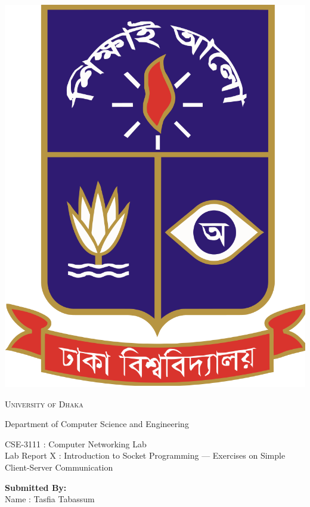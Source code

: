 \documentclass[11pt]{article}
\begin{document}
\begin{titlepage}
	\begin{center}
    	\includegraphics[scale=0.10]{du.png}\par
		\begin{Huge}
			\textsc{University of Dhaka}\par
		\end{Huge}
		\begin{Large}
			Department of Computer Science and Engineering\par \vspace{1cm}
			CSE-3111 : Computer Networking Lab \\[12pt]	
			Lab Report X : Introduction to Socket Programming — Exercises on Simple Client-Server Communication
		\end{Large}
	\end{center}  	
	\begin{large}
		\textbf{Submitted By:\\[12pt]}
			Name : Tasfia Tabassum\\[8pt]

\end{large}
\end{titlepage}
\end{document}
